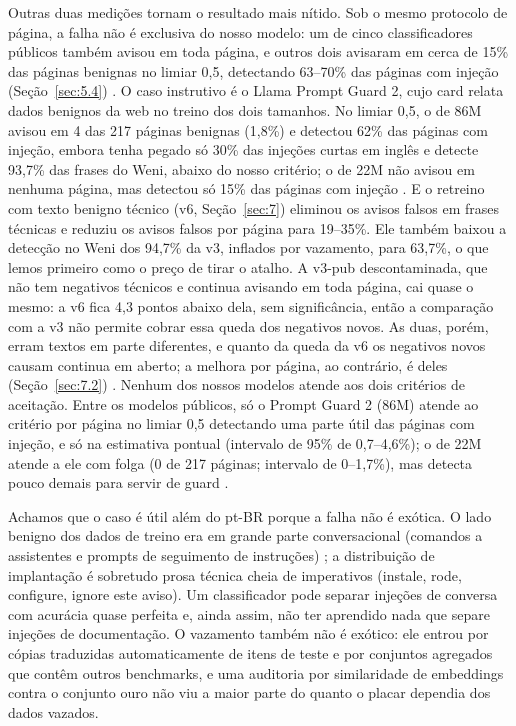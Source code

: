 \documentclass[11pt]{article}
\begin{document}
Outras duas medições tornam o resultado mais nítido. Sob o mesmo protocolo de página, a falha não é exclusiva do nosso modelo: um de cinco classificadores públicos também avisou em toda página, e outros dois avisaram em cerca de 15\% das páginas benignas no limiar 0,5, detectando 63–70\% das páginas com injeção (Seção~\ref{sec:5.4})%
. O caso instrutivo é o Llama Prompt Guard 2, cujo card relata dados benignos da web no treino dos dois tamanhos. No limiar 0,5, o de 86M avisou em 4 das 217 páginas benignas (1,8\%) e detectou 62\% das páginas com injeção, embora tenha pegado só 30\% das injeções curtas em inglês e detecte 93,7\% das frases do Weni, abaixo do nosso critério; o de 22M não avisou em nenhuma página, mas detectou só 15\% das páginas com injeção%
. E o retreino com texto benigno técnico (v6, Seção~\ref{sec:7}) eliminou os avisos falsos em frases técnicas e reduziu os avisos falsos por página para 19–35\%. Ele também baixou a detecção no Weni dos 94,7\% da v3, inflados por vazamento, para 63,7\%, o que lemos primeiro como o preço de tirar o atalho. A v3-pub descontaminada, que não tem negativos técnicos e continua avisando em toda página, cai quase o mesmo: a v6 fica 4,3 pontos abaixo dela, sem significância, então a comparação com a v3 não permite cobrar essa queda dos negativos novos. As duas, porém, erram textos em parte diferentes, e quanto da queda da v6 os negativos novos causam continua em aberto; a melhora por página, ao contrário, é deles (Seção~\ref{sec:7.2})%
. Nenhum dos nossos modelos atende aos dois critérios de aceitação. Entre os modelos públicos, só o Prompt Guard 2 (86M) atende ao critério por página no limiar 0,5 detectando uma parte útil das páginas com injeção, e só na estimativa pontual (intervalo de 95\% de 0,7–4,6\%); o de 22M atende a ele com folga (0 de 217 páginas; intervalo de 0–1,7\%), mas detecta pouco demais para servir de guard%
.

Achamos que o caso é útil além do pt-BR porque a falha não é exótica. O lado benigno dos dados de treino era em grande parte conversacional (comandos a assistentes e prompts de seguimento de instruções)%
; a distribuição de implantação é sobretudo prosa técnica cheia de imperativos (instale, rode, configure, ignore este aviso). Um classificador pode separar injeções de conversa com acurácia quase perfeita e, ainda assim, não ter aprendido nada que separe injeções de documentação. O vazamento também não é exótico: ele entrou por cópias traduzidas automaticamente de itens de teste e por conjuntos agregados que contêm outros benchmarks, e uma auditoria por similaridade de embeddings contra o conjunto ouro não viu a maior parte do quanto o placar dependia dos dados vazados.
\end{document}
